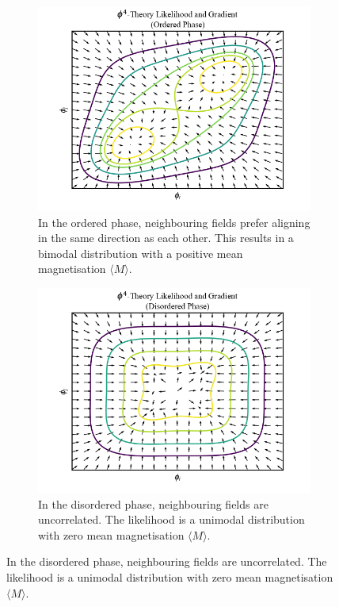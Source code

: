 \documentclass[11pt]{article}
\begin{document}
    \begin{figure}[t!]
        \centering
        \begin{subfigure}{\linewidth}
            \centering
            \includegraphics[width=\linewidth]{../figures/Phi4LikelihoodOrdered}
            \caption{
            In the ordered phase, neighbouring fields prefer aligning in the same direction as each other.
            This results in a bimodal distribution with a positive mean magnetisation $\langle M \rangle$.}
            \label{fig:phi4likelihood_ordered}
        \end{subfigure}
        \begin{subfigure}{\linewidth}
            \centering
            \includegraphics[width=\linewidth]{../figures/Phi4LikelihoodDisordered}
            \caption{
            In the disordered phase, neighbouring fields are uncorrelated. The likelihood is a unimodal distribution
            with zero mean magnetisation $\langle M \rangle$.}
            \label{fig:phi4likelihood_disordered}
        \end{subfigure}
    \end{figure}
\end{document}
